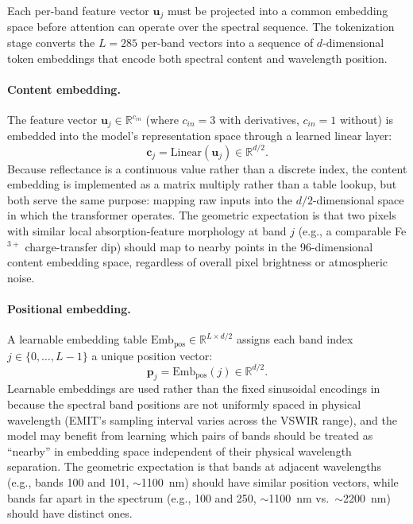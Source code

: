 \documentclass[11pt]{report}
\newcommand{\R}{\mathbb{R}}
\begin{document}
Each per-band feature vector $\mathbf{u}_j$ must be projected into a common embedding space before attention can operate over the spectral sequence.
The tokenization stage converts the $L = 285$ per-band vectors into a sequence of $d$-dimensional token embeddings that encode both spectral content and wavelength position.

\paragraph{Content embedding.}
The feature vector $\mathbf{u}_j \in \R^{c_{in}}$ (where $c_{in} = 3$ with derivatives, $c_{in} = 1$ without) is embedded into the model's representation space through a learned linear layer:
\begin{equation}
\mathbf{c}_j = \text{Linear}(\mathbf{u}_j) \in \R^{d/2}.
\label{eq:content_emb}
\end{equation}
Because reflectance is a continuous value rather than a discrete index, the content embedding is implemented as a matrix multiply rather than a table lookup, but both serve the same purpose: mapping raw inputs into the $d/2$-dimensional space in which the transformer operates. The geometric expectation is that two pixels with similar local absorption-feature morphology at band $j$ (e.g., a comparable Fe$^{3+}$ charge-transfer dip) should map to nearby points in the 96-dimensional content embedding space, regardless of overall pixel brightness or atmospheric noise.

\paragraph{Positional embedding.}
A learnable embedding table $\text{Emb}_{\text{pos}} \in \R^{L \times d/2}$ assigns each band index $j \in \{0, \ldots, L-1\}$ a unique position vector:
\begin{equation}
\mathbf{p}_j = \text{Emb}_{\text{pos}}(j) \in \R^{d/2}.
\label{eq:pos_emb}
\end{equation}
Learnable embeddings are used rather than the fixed sinusoidal encodings in \cite{vaswani2017attention} because the spectral band positions are not uniformly spaced in physical wavelength (EMIT's sampling interval varies across the VSWIR range),
and the model may benefit from learning which pairs of bands should be treated as ``nearby'' in embedding space independent of their physical wavelength separation. The geometric expectation is that bands at adjacent wavelengths (e.g., bands 100 and 101, $\sim$1100~nm) should have similar position vectors, while bands far apart in the spectrum (e.g., 100 and 250, $\sim$1100~nm vs.\ $\sim$2200~nm) should have distinct ones.
\end{document}
